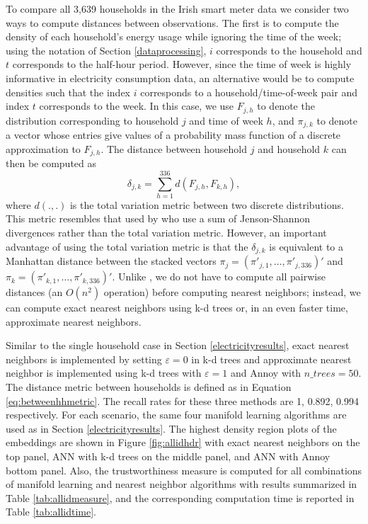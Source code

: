 \documentclass[11pt,a4paper,]{article}
\begin{document}
To compare all 3,639 households in the Irish smart meter data we consider two ways to compute distances between observations. The first is to compute the density of each household's energy usage while ignoring the time of the week; using the notation of Section \ref{dataprocessing}, \(i\) corresponds to the household and \(t\) corresponds to the half-hour period. However, since the time of week is highly informative in electricity consumption data, an alternative would be to compute densities such that the index \(i\) corresponds to a household/time-of-week pair and index \(t\) corresponds to the week. In this case, we use \(F_{j,h}\) to denote the distribution corresponding to household \(j\) and time of week \(h\), and \(\pi_{j,k}\) to denote a vector whose entries give values of a probability mass function of a discrete approximation to \(F_{j,h}\). The distance between household \(j\) and household \(k\) can then be computed as
\begin{equation}\label{eq:betweenhhmetric}
  \delta_{j,k}=\sum\limits_{h=1}^{336}d(F_{j,h},F_{k,h}),
\end{equation}
where \(d(.,.)\) is the total variation metric between two discrete distributions. This metric resembles that used by \textcite{Hyndman2018-ia} who use a sum of Jenson-Shannon divergences rather than the total variation metric. However, an important advantage of using the total variation metric is that the \(\delta_{j,k}\) is equivalent to a Manhattan distance between the stacked vectors \(\pi_j=(\pi'_{j,1},\ldots,\pi'_{j,336})'\) and \(\pi_k=(\pi'_{k,1},\ldots,\pi'_{k,336})'\). Unlike \textcite{Hyndman2018-ia}, we do not have to compute all pairwise distances (an \(O(n^2)\) operation) before computing nearest neighbors; instead, we can compute exact nearest neighbors using k-d trees or, in an even faster time, approximate nearest neighbors.

Similar to the single household case in Section \ref{electricityresults}, exact nearest neighbors is implemented by setting \(\varepsilon=0\) in k-d trees and approximate nearest neighbor is implemented using k-d trees with \(\varepsilon=1\) and Annoy with \(\textit{n\_trees}=50\). The distance metric between households is defined as in Equation \eqref{eq:betweenhhmetric}. The recall rates for these three methods are 1, 0.892, 0.994 respectively. For each scenario, the same four manifold learning algorithms are used as in Section \ref{electricityresults}. The highest density region plots of the embeddings are shown in Figure \ref{fig:allidhdr} with exact nearest neighbors on the top panel, ANN with k-d trees on the middle panel, and ANN with Annoy bottom panel. Also, the trustworthiness measure is computed for all combinations of manifold learning and nearest neighbor algorithms with results summarized in Table \ref{tab:allidmeasure}, and the corresponding computation time is reported in Table \ref{tab:allidtime}.
\end{document}
